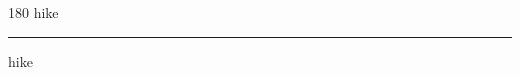 
\begin{frame}
\begin{center}
\begin{turn}{180}
{\fontsize{2.5cm}{1em}\selectfont hike}
\end{turn}
\vspace{1em}\par  
\hrule
\vspace{1em}\par  
{\fontsize{2.5cm}{1em}\selectfont hike}
\end{center}
\end{frame}
